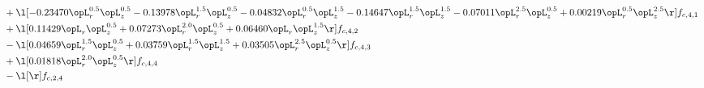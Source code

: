 \begin{alignat}{2}
& + \l[  -0.23470 \opL_r^{0.5} \opL_z^{0.5}   -0.13978 \opL_r^{1.5} \opL_z^{0.5}   -0.04832 \opL_r^{0.5} \opL_z^{1.5}   -0.14647 \opL_r^{1.5} \opL_z^{1.5}   -0.07011 \opL_r^{2.5} \opL_z^{0.5} +  0.00219 \opL_r^{0.5} \opL_z^{2.5}  \r] f_{c,4,1} \nonumber \\ 
& + \l[  0.11429 \opL_r \opL_z^{0.5} +  0.07273 \opL_r^{2.0} \opL_z^{0.5} +  0.06460 \opL_r \opL_z^{1.5}  \r] f_{c,4,2} \nonumber \\ 
& - \l[  0.04659 \opL_r^{1.5} \opL_z^{0.5} +  0.03759 \opL_r^{1.5} \opL_z^{1.5} +  0.03505 \opL_r^{2.5} \opL_z^{0.5}  \r] f_{c,4,3} \nonumber \\ 
& + \l[  0.01818 \opL_r^{2.0} \opL_z^{0.5}  \r] f_{c,4,4} \nonumber \\ 
& - \l[  \r] f_{c,2,4} \nonumber \\ 
\end{alignat} 


